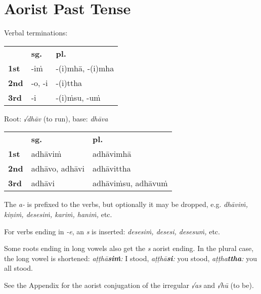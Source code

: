 \documentclass[11pt,oneside]{memoir}
\begin{document}
\clearpage

\section{Aorist Past Tense}
\label{sec:orge225a7e}

{\centering\par
\begin{multicols}{2}

Verbal terminations:

\begin{center}
\begin{tabular}{lll}
 & \textbf{sg.} & \textbf{pl.}\\[0pt]
\textbf{1st} & -iṁ & -(i)mhā, -(i)mha\\[0pt]
\textbf{2nd} & -o, -i & -(i)ttha\\[0pt]
\textbf{3rd} & -i & -(i)ṁsu, -uṁ\\[0pt]
\end{tabular}
\end{center}

\columnbreak

Root: \emph{√dhāv} (to run), base: \emph{dhāva}

\begin{center}
\begin{tabular}{lll}
 & \textbf{sg.} & \textbf{pl.}\\[0pt]
\textbf{1st} & adhāviṁ & adhāvimhā\\[0pt]
\textbf{2nd} & adhāvo, adhāvi & adhāvittha\\[0pt]
\textbf{3rd} & adhāvi & adhāviṁsu, adhāvuṁ\\[0pt]
\end{tabular}
\end{center}

\end{multicols}
\par}

The \emph{a-} is prefixed to the verbs, but optionally it may be dropped, e.g.
\emph{dhāviṁ, kiṇiṁ, desesiṁ, kariṁ, haniṁ,} etc.

For verbs ending in \emph{-e}, an \emph{s} is inserted: \emph{desesiṁ, desesi, desesuṁ,} etc.

Some roots ending in long vowels also get the \emph{s} aorist ending. In the plural case, the long vowel is shortened:
\emph{aṭṭhā\textbf{siṁ}:} I stood, \emph{aṭṭhā\textbf{si}:} you stood, \emph{aṭṭha\textbf{ttha}:} you all stood.

See the Appendix for the aorist conjugation of the irregular \emph{√as} and \emph{√hū} (to be).
\end{document}
